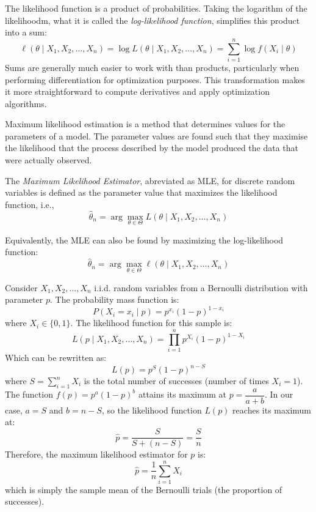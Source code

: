 The likelihood function is a product of probabilities. Taking the logarithm of the likelihoodm, what it is called the \emph{log-likelihood function}, simplifies this product into a sum:
\[
\ell(\theta \mid X_1, X_2, \dots, X_n) = \log L(\theta \mid X_1, X_2, \dots, X_n) = \sum_{i=1}^{n} \log f(X_i \mid \theta)
\]
Sums are generally much easier to work with than products, particularly when performing differentiation for optimization purposes. This transformation makes it more straightforward to compute derivatives and apply optimization algorithms.

Maximum likelihood estimation is a method that determines values for the parameters of a model. The parameter values are found such that they maximise the likelihood that the process described by the model produced the data that were actually observed.

\begin{definition}
The \emph{Maximum Likelihood Estimator}, abreviated as MLE, for discrete random variables is defined as the parameter value that maximizes the likelihood function, i.e.,
\[
\hat{\theta}_n = \arg \max_{\theta \in \Theta} L(\theta \mid X_1, X_2, \dots, X_n)
\]
\end{definition}

Equivalently, the MLE can also be found by maximizing the log-likelihood function:
\[
\hat{\theta}_n = \arg \max_{\theta \in \Theta} \ell(\theta \mid X_1, X_2, \dots, X_n)
\]

\begin{example}
Consider \( X_1, X_2, \dots, X_n \) i.i.d. random variables from a Bernoulli distribution with parameter \( p \). The probability mass function is:
\[
P(X_i = x_i \mid p) = p^{x_i}(1 - p)^{1 - x_i}
\]
where \( X_i \in \{0, 1\} \). The likelihood function for this sample is:
\[
L(p \mid X_1, X_2, \dots, X_n) = \prod_{i=1}^{n} p^{X_i}(1 - p)^{1 - X_i}
\]
Which can be rewritten as:
\[
L(p) = p^S (1 - p)^{n - S}
\]
where \( S = \sum_{i=1}^{n} X_i \) is the total number of successes (number of times \( X_i = 1 \)).  The function \( f(p) = p^a (1 - p)^b \) attains its maximum at \( p = \dfrac{a}{a + b} \). In our case, \( a = S \) and \( b = n - S \), so the likelihood function \( L(p) \) reaches its maximum at:
\[
\hat{p} = \dfrac{S}{S + (n - S)} = \dfrac{S}{n}
\]
Therefore, the maximum likelihood estimator for \( p \) is:
\[
\hat{p} = \dfrac{1}{n} \sum_{i=1}^{n} X_i
\]
which is simply the sample mean of the Bernoulli trials (the proportion of successes).
\end{example}

